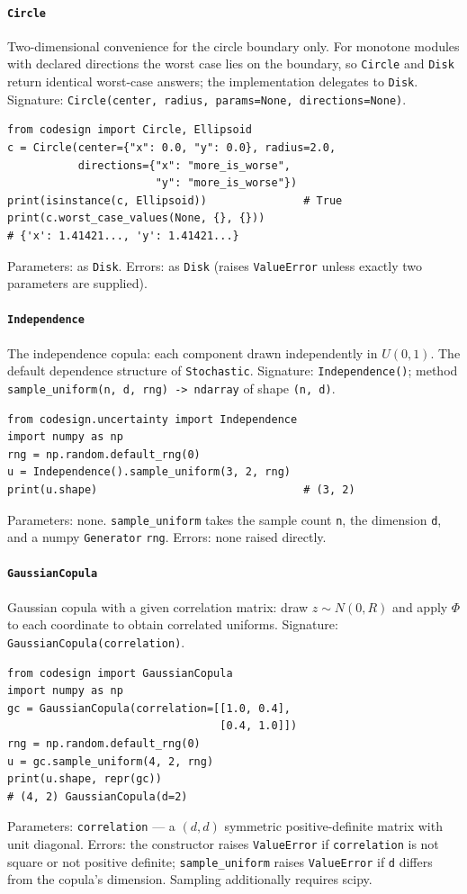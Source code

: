 \documentclass[11pt,a4paper]{article}
\begin{document}
\paragraph{\texttt{Circle}}\label{ref:uncertainty:circle}
Two-dimensional convenience for the circle boundary only. For monotone
modules with declared directions the worst case lies on the boundary, so
\texttt{Circle} and \texttt{Disk} return identical worst-case answers; the
implementation delegates to \texttt{Disk}.
Signature: \texttt{Circle(center, radius, params=None, directions=None)}.
\begin{lstlisting}
from codesign import Circle, Ellipsoid
c = Circle(center={"x": 0.0, "y": 0.0}, radius=2.0,
           directions={"x": "more_is_worse",
                       "y": "more_is_worse"})
print(isinstance(c, Ellipsoid))               # True
print(c.worst_case_values(None, {}, {}))
# {'x': 1.41421..., 'y': 1.41421...}
\end{lstlisting}
Parameters: as \texttt{Disk}. Errors: as \texttt{Disk} (raises
\texttt{ValueError} unless exactly two parameters are supplied).


\paragraph{\texttt{Independence}}\label{ref:uncertainty:independence}
The independence copula: each component drawn independently in $U(0,1)$. The
default dependence structure of \texttt{Stochastic}.
Signature: \texttt{Independence()}; method
\texttt{sample\_uniform(n, d, rng) -> ndarray} of shape \texttt{(n, d)}.
\begin{lstlisting}
from codesign.uncertainty import Independence
import numpy as np
rng = np.random.default_rng(0)
u = Independence().sample_uniform(3, 2, rng)
print(u.shape)                                # (3, 2)
\end{lstlisting}
Parameters: none. \texttt{sample\_uniform} takes the sample count \texttt{n},
the dimension \texttt{d}, and a numpy \texttt{Generator} \texttt{rng}.
Errors: none raised directly.

\paragraph{\texttt{GaussianCopula}}\label{ref:uncertainty:gaussiancopula}
Gaussian copula with a given correlation matrix: draw $z \sim N(0, R)$ and
apply $\Phi$ to each coordinate to obtain correlated uniforms.
Signature: \texttt{GaussianCopula(correlation)}.
\begin{lstlisting}
from codesign import GaussianCopula
import numpy as np
gc = GaussianCopula(correlation=[[1.0, 0.4],
                                 [0.4, 1.0]])
rng = np.random.default_rng(0)
u = gc.sample_uniform(4, 2, rng)
print(u.shape, repr(gc))
# (4, 2) GaussianCopula(d=2)
\end{lstlisting}
Parameters: \texttt{correlation} --- a $(d,d)$ symmetric positive-definite
matrix with unit diagonal. Errors: the constructor raises \texttt{ValueError}
if \texttt{correlation} is not square or not positive definite;
\texttt{sample\_uniform} raises \texttt{ValueError} if \texttt{d} differs from
the copula's dimension. Sampling additionally requires scipy.
\end{document}
